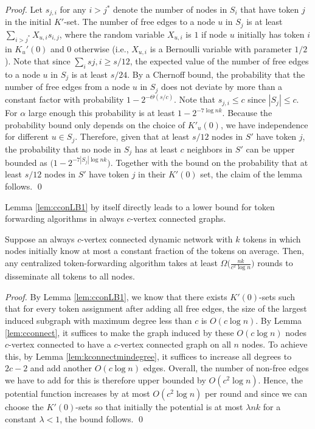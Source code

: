 \documentclass{llncs}
\begin{document}
\begin{proof}
    Let $s_{j,i}$ for any $i>j^*$ denote the number of nodes in $S_i$
    that have token $j$ in the initial $K'$-set. The number of free
    edges to a node $u$ in $S_j$ is at least $\sum_{i > j^*} X_{u,i}
    s_{i,j}$, where the random variable $X_{u,i}$ is $1$ if node $u$
    initially has token $i$ in $K_u'(0)$ and $0$ otherwise (i.e.,
    $X_{u,i}$ is a Bernoulli variable with parameter $1/2$). Note that
    since $\sum_i s{j,i}\geq s/12$, the expected value of the number
    of free edges to a node $u$ in $S_j$ is at least $s/24$. By a
    Chernoff bound, the probability that the number of free edges from
    a node $u$ in $S_j$ does not deviate by more than a constant
    factor with probability $1-2^{-\Theta(s/c)}$. Note that
    $s_{j,i}\leq c$ since $|S_j|\leq c$.  For $\alpha$ large enough
    this probability is at least $1-2^{-7\log nk}$. Because the
    probability bound only depends on the choice of $K'_u(0)$, we have
    independence for different $u\in S_j$. Therefore, given that at
    least $s/12$ nodes in $S'$ have token $j$, the probability that no
    node in $S_j$ has at least $c$ neighbors in $S'$ can be upper
    bounded as $\big(1-2^{-7|S_j|\log nk}\big)$. Together with the
    bound on the probability that at least $s/12$ nodes in $S'$ have
    token $j$ in their $K'(0)$ set, the claim of the lemma follows.
\hspace*{\fill}\qed\end{proof}

Lemma \ref{lem:cconLB1} by itself directly leads to a lower bound for
token forwarding algorithms in always $c$-vertex connected
graphs. 

\begin{corollary}\label{cor:simplecconn}
    Suppose an always $c$-vertex connected dynamic network with $k$
    tokens in which nodes initially know at most a constant fraction
    of the tokens on average.  Then, any centralized token-forwarding
    algorithm takes at least $\Omega\big(\frac{nk}{c^2\log n}\big)$
    rounds to disseminate all tokens to all nodes.
\end{corollary}
\begin{proof}
    By Lemma \ref{lem:cconLB1}, we know that there exists $K'(0)$-sets
    such that for every token assignment after adding all free edges,
    the size of the largest induced subgraph with maximum degree less
    than $c$ is $O(c\log n)$. By Lemma \ref{lem:cconnect}, it suffices
    to make the graph induced by these $O(c\log n)$ nodes $c$-vertex
    connected to have a $c$-vertex connected graph on all $n$
    nodes. To achieve this, by Lemma \ref{lem:kconnectmindegree}, it
    suffices to increase all degrees to $2c-2$ and add another
    $O(c\log n)$ edges. Overall, the number of non-free edges we have
    to add for this is therefore upper bounded by $O(c^2\log
    n)$. Hence, the potential function increases by at most $O(c^2\log
    n)$ per round and since we can choose the $K'(0)$-sets so that
    initially the potential is at most $\lambda nk$ for a constant
    $\lambda<1$, the bound follows.
\hspace*{\fill}\qed\end{proof}
\end{document}
